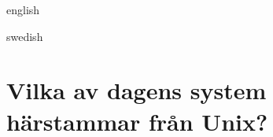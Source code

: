 \begingroup
\newcommand{\scholarnonlatin}[1]{{\fontencoding{T2A}\selectfont #1}}%
\begin{onlyin}{english} %

\end{onlyin}
\begin{onlyin}{swedish}

\end{onlyin}
\endgroup

\chapter{%
  {Vilka av dagens system härstammar från Unix?}} %
\label{app:unix-lineage}

